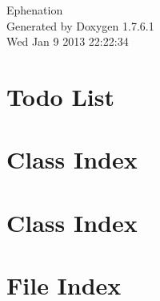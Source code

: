 \documentclass[a4paper]{book}
\begin{document}
\hypersetup{pageanchor=false,citecolor=blue}
\begin{titlepage}
\vspace*{7cm}
\begin{center}
{\Large \-Ephenation }\\
\vspace*{1cm}
{\large \-Generated by Doxygen 1.7.6.1}\\
\vspace*{0.5cm}
{\small Wed Jan 9 2013 22:22:34}\\
\end{center}
\end{titlepage}
\clearemptydoublepage
{}
\tableofcontents
\clearemptydoublepage
{}
\hypersetup{pageanchor=true,citecolor=blue}
\chapter{\-Todo \-List}
\label{todo}
\hypertarget{todo}{}

\chapter{\-Class \-Index}

\chapter{\-Class \-Index}

\chapter{\-File \-Index}

\end{document}
